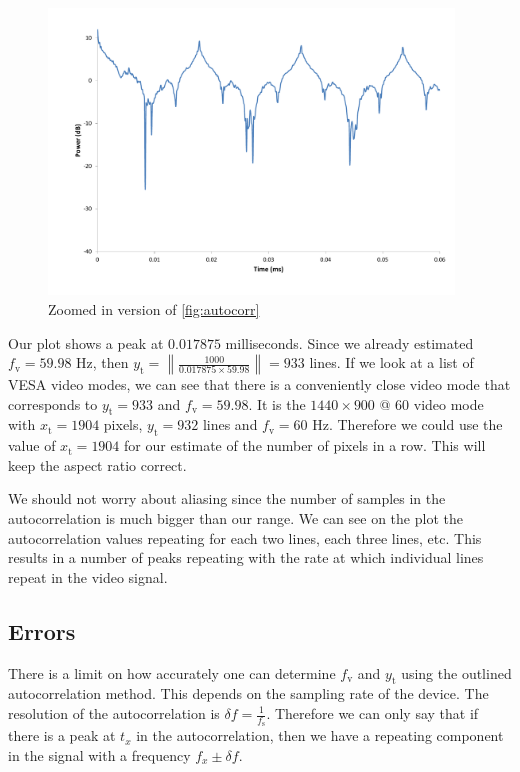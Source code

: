 \documentclass[a4paper,12pt,twoside,openright]{report}
\begin{document}
\begin{figure}[h]
\centering
  \includegraphics[width=0.96\textwidth]{autocorr_zoomed}
  \caption{Zoomed in version of \ref{fig:autocorr}}
  \label{fig:autocorr_zoomed}
\end{figure}

Our plot shows a peak at $0.017875$ milliseconds. Since we already estimated $f_\text{v} = 59.98$ Hz, then $y_\text{t} = \left\| \frac{1000}{0.017875 \times 59.98} \right\| = 933$ lines. If we look at a list of VESA video modes, we can see that there is a conveniently close video mode that corresponds to $y_\text{t} = 933$ and $f_\text{v} = 59.98$. It is the $1440 \times 900$ @ $60$ video mode with $x_\text{t} = 1904$ pixels, $y_\text{t} = 932$ lines and $f_\text{v}=60$ Hz. Therefore we could use the value of $x_\text{t} = 1904$ for our estimate of the number of pixels in a row. This will keep the aspect ratio correct.

We should not worry about aliasing since the number of samples in the autocorrelation is much bigger than our range. We can see on the plot the autocorrelation values repeating for each two lines, each three lines, etc. This results in a number of peaks repeating with the rate at which individual lines repeat in the video signal.

\subsection{Errors}

There is a limit on how accurately one can determine $f_\text{v}$ and $y_\text{t}$ using the outlined autocorrelation method. This depends on the sampling rate of the device. The resolution of the autocorrelation is $\delta f = \frac{1}{f_\text{s}}$. Therefore we can only say that if there is a peak at $t_{x}$ in the autocorrelation, then we have a repeating component in the signal with a frequency $f_{x} \pm \delta f$.
\end{document}
